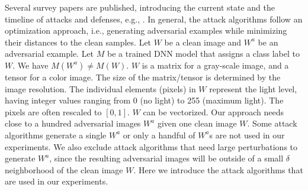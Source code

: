 \documentclass[12pt]{article}
\begin{document}
Several survey papers are published, introducing the
current state and the timeline of attacks and defenses, e.g.,
\cite{survey-1,survey-2,xi-wires-2020}. In
general, the attack algorithms follow an optimization approach, i.e.,
generating adversarial examples while minimizing their distances to
the clean samples.
Let $W$ be a clean image and $W^a$ be an adversarial
example. Let $M$ be a trained DNN model that assigns a class label to
$W$. We have $M(W^a)\neq M(W)$. 
$W$ is a matrix for a gray-scale image, and a tensor for a color
image. The size of the matrix/tensor is determined by the image
resolution. The individual elements (pixels) in $W$ represent the
light level, having integer values ranging from 0 (no light) to 255
(maximum light). The pixels are often rescaled to $[0,1]$. $W$ can be
vectorized. Our approach needs close to a hundred adversarial images
$W^a$ given one clean image $W$.  Some attack algorithms generate 
a single $W^a$ or only a handful of $W^a$s are not used in our
experiments. We also exclude attack algorithms that need large
perturbations to generate $W^a$, since the resulting adversarial
images will be outside of a small $\delta$ neighborhood of the
clean image $W$.  Here we introduce the attack algorithms
that are used in our experiments. 
%
\end{document}
